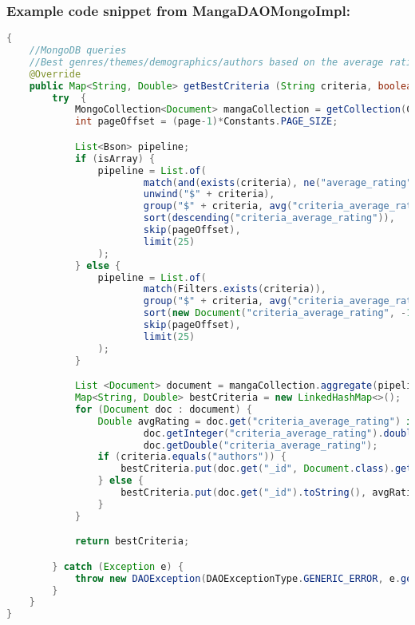 \subsubsection*{Example code snippet from MangaDAOMongoImpl:}
\begin{mdframed}[style=customstyle]
    \begin{lstlisting}[language=java]
{
    //MongoDB queries
    //Best genres/themes/demographics/authors based on the average rating
    @Override
    public Map<String, Double> getBestCriteria (String criteria, boolean isArray, int page) throws DAOException {
        try  {
            MongoCollection<Document> mangaCollection = getCollection(COLLECTION_NAME);
            int pageOffset = (page-1)*Constants.PAGE_SIZE;

            List<Bson> pipeline;
            if (isArray) {
                pipeline = List.of(
                        match(and(exists(criteria), ne("average_rating", null))),
                        unwind("$" + criteria),
                        group("$" + criteria, avg("criteria_average_rating", "$average_rating")),
                        sort(descending("criteria_average_rating")),
                        skip(pageOffset),
                        limit(25)
                );
            } else {
                pipeline = List.of(
                        match(Filters.exists(criteria)),
                        group("$" + criteria, avg("criteria_average_rating", "$average_rating")),
                        sort(new Document("criteria_average_rating", -1)),
                        skip(pageOffset),
                        limit(25)
                );
            }

            List <Document> document = mangaCollection.aggregate(pipeline).into(new ArrayList<>());
            Map<String, Double> bestCriteria = new LinkedHashMap<>();
            for (Document doc : document) {
                Double avgRating = doc.get("criteria_average_rating") instanceof Integer?
                        doc.getInteger("criteria_average_rating").doubleValue() :
                        doc.getDouble("criteria_average_rating");
                if (criteria.equals("authors")) {
                    bestCriteria.put(doc.get("_id", Document.class).getString("name"), avgRating);
                } else {
                    bestCriteria.put(doc.get("_id").toString(), avgRating);
                }
            }

            return bestCriteria;

        } catch (Exception e) {
            throw new DAOException(DAOExceptionType.GENERIC_ERROR, e.getMessage());
        }
    }
}\end{lstlisting}
\end{mdframed}

